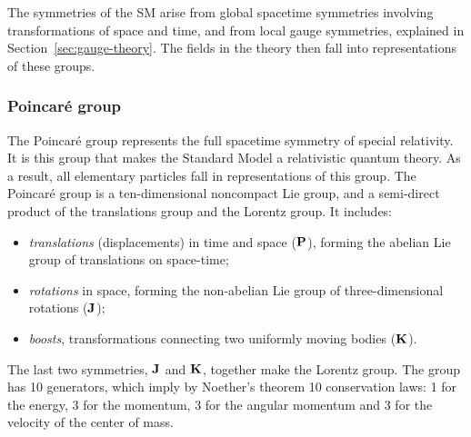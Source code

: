 The symmetries of the SM arise from  global spacetime symmetries involving transformations of space and time, and from local gauge symmetries, explained in Section~\ref{sec:gauge-theory}. The fields in the theory then fall into representations of these groups.

\subsubsection{Poincaré group}

The Poincaré group represents the full spacetime symmetry of special relativity. It is this group that makes the Standard Model a relativistic quantum theory. As a result, all elementary particles fall in representations of this group. The Poincaré group is a ten-dimensional noncompact Lie group, and a semi-direct product of the translations group and the Lorentz group. It includes:
\begin{itemize}
\item \emph{translations} (displacements) in time and space ($\vb{P}$), forming the abelian Lie group of translations on space-time;
\item \emph{rotations} in space, forming the non-abelian Lie group of three-dimensional rotations ($\vb{J}$);
\item \emph{boosts}, transformations connecting two uniformly moving bodies ($\vb{K}$).
\end{itemize}
The last two symmetries, $\vb{J}$ and $\vb{K}$, together make the Lorentz group. The group has 10 generators, which imply by Noether's theorem 10 conservation laws: 1 for the energy, 3 for the momentum, 3 for the angular momentum and 3 for the velocity of the center of mass.

